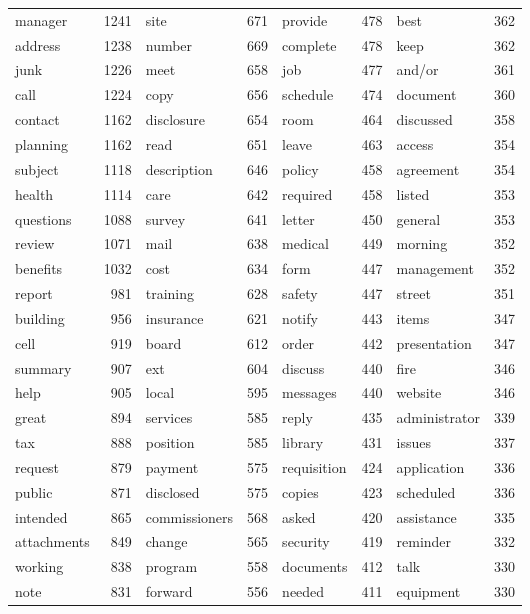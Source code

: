 \documentclass{pnastwo}
\begin{document}
\begin{article}
\begin{table}[ht]
\begin{tabular}{lr|lr|lr|lr}
  \cellcolor{lred} manager & 1241 & site & 671 & provide & 478 & best & 362 \\ 
   address & 1238 & number & 669 & complete & 478 & keep & 362 \\ 
  \cellcolor{lred} junk & 1226 & meet & 658 & job & 477 & \cellcolor{lred} and/or & 361 \\ 
   call & 1224 & copy & 656 & schedule & 474 & document & 360 \\ 
   contact & 1162 & disclosure & 654 & room & 464 & discussed & 358 \\ 
   planning & 1162 & read & 651 & leave & 463 & access & 354 \\ 
   subject & 1118 & description & 646 & policy & 458 & agreement & 354 \\ 
   health & 1114 & care & 642 & required & 458 & listed & 353 \\ 
   questions & 1088 & survey & 641 & letter & 450 & general & 353 \\ 
   review & 1071 & mail & 638 & medical & 449 & morning & 352 \\ 
   benefits & 1032 & cost & 634 & form & 447 & management & 352 \\ 
   report &  981 & training & 628 & safety & 447 & street & 351 \\ 
   building &  956 & insurance & 621 & notify & 443 & items & 347 \\ 
  \cellcolor{lred} cell &  919 & board & 612 & order & 442 & presentation & 347 \\ 
   summary &  907 & \cellcolor{lred} ext & 604 & discuss & 440 & fire & 346 \\ 
   help &  905 & local & 595 & messages & 440 & website & 346 \\ 
   great &  894 & services & 585 & reply & 435 & administrator & 339 \\ 
   tax &  888 & position & 585 & library & 431 & issues & 337 \\ 
   request &  879 & payment & 575 & requisition & 424 & application & 336 \\ 
   public &  871 & disclosed & 575 & copies & 423 & scheduled & 336 \\ 
   intended &  865 & commissioners & 568 & asked & 420 & assistance & 335 \\ 
   attachments &  849 & change & 565 & security & 419 & reminder & 332 \\ 
   working &  838 & program & 558 & documents & 412 & talk & 330 \\ 
   note &  831 & forward & 556 & needed & 411 & equipment & 330 \\ 

\end{tabular}
\end{table}
\end{article}
\end{document}
